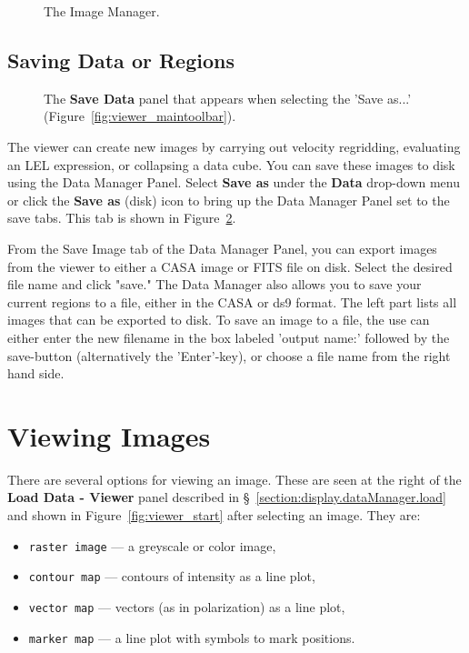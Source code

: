 \begin{figure}[h!]
\begin{center}
\caption{\label{fig:viewer_imanager} The Image Manager.}
\hrulefill
\end{center}
\end{figure}



\subsection{Saving Data or Regions}
\label{section:display.viewerGUI.save}

\begin{figure}[h!]
\begin{center}
\caption{\label{fig:viewer_save} The {\bf Save Data} panel
that appears when selecting the 'Save as...'  (Figure~\ref{fig:viewer_maintoolbar}).} 
\hrulefill
\end{center}
\end{figure}

The viewer can create new images by carrying out velocity regridding, evaluating an LEL
expression, or collapsing a data cube. You can save these images to disk using the 
Data Manager Panel. Select {\bf Save as} under the {\bf Data} drop-down menu or
click the {\bf Save as} (disk) icon to bring up the Data Manager Panel set to the save tabs.
This tab is shown in Figure~\ref{fig:viewer_save}. 

From the Save Image tab of the Data Manager Panel, you can export images from the
viewer to either a CASA image or FITS file on disk. Select the desired file name and click
"save." The Data Manager also allows you to save your current regions to a file, either in the CASA
or ds9 format. The left part lists all images that can be exported to disk.  To save an
image to a file, the use can either enter the new filename in the box
labeled 'output name:' followed by the save-button (alternatively the
'Enter'-key), or choose a file name from the right hand side.

\section{Viewing Images}
\label{section:display.image}

There are several options for viewing an image.  These are seen
at the right of the {\bf Load Data - Viewer} panel 
described in \S~\ref{section:display.dataManager.load} and shown in 
Figure~\ref{fig:viewer_start} after selecting an image.  They are:
\begin{itemize}
   \item {\tt raster image} --- a greyscale or color image,
   \item {\tt contour map} --- contours of intensity as a line plot,
   \item {\tt vector map} --- vectors (as in polarization) as a line plot,
   \item {\tt marker map} --- a line plot with symbols to mark positions.
\end{itemize}

